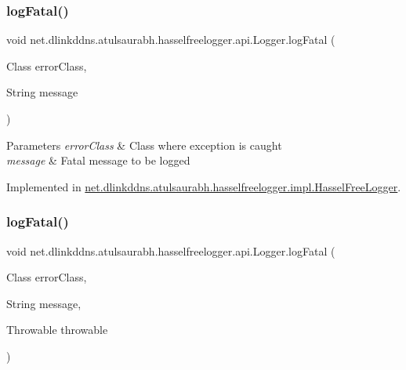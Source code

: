 \subsubsection{\texorpdfstring{log\+Fatal()}{logFatal()}\hspace{0.1cm}{\footnotesize\ttfamily [2/3]}}
{\footnotesize\ttfamily void net.\+dlinkddns.\+atulsaurabh.\+hasselfreelogger.\+api.\+Logger.\+log\+Fatal (\begin{DoxyParamCaption}\item[{Class}]{error\+Class,  }\item[{String}]{message }\end{DoxyParamCaption})}


\begin{DoxyParams}{Parameters}
{\em error\+Class} & Class where exception is caught \\
\hline
{\em message} & Fatal message to be logged \\
\hline
\end{DoxyParams}


Implemented in \mbox{\hyperlink{classnet_1_1dlinkddns_1_1atulsaurabh_1_1hasselfreelogger_1_1impl_1_1_hassel_free_logger_a40d4e893854bc742145dbf2fe5d2aa43}{net.\+dlinkddns.\+atulsaurabh.\+hasselfreelogger.\+impl.\+Hassel\+Free\+Logger}}.

\mbox{\label{interfacenet_1_1dlinkddns_1_1atulsaurabh_1_1hasselfreelogger_1_1api_1_1_logger_a9ac7490ed937913b6dd97ee8898119bb}} 
\subsubsection{\texorpdfstring{log\+Fatal()}{logFatal()}\hspace{0.1cm}{\footnotesize\ttfamily [3/3]}}
{\footnotesize\ttfamily void net.\+dlinkddns.\+atulsaurabh.\+hasselfreelogger.\+api.\+Logger.\+log\+Fatal (\begin{DoxyParamCaption}\item[{Class}]{error\+Class,  }\item[{String}]{message,  }\item[{Throwable}]{throwable }\end{DoxyParamCaption})}


